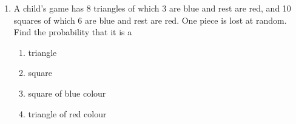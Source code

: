 \begin{enumerate}
\item A child's game has 8 triangles of which 3 are blue and rest are red, and 10 squares of which 6 are blue and rest are red. One piece is lost at random. Find the probability that it is a
\renewcommand{\labelenumi}{(\roman{enumi})}
\begin{enumerate}
\item triangle 
\item square 
\item square of blue colour 
\item triangle of red colour           
\end{enumerate}
\\ \solution

\end{enumerate}
